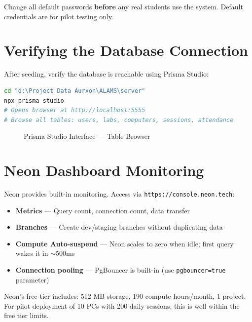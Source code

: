 \begin{tcolorbox}[dangerbox, title={\faExclamationCircle\quad Security Requirement}]
Change all default passwords \textbf{before} any real students use the system. Default credentials are for pilot testing only.
\end{tcolorbox}

\section{Verifying the Database Connection}

After seeding, verify the database is reachable using Prisma Studio:

\begin{tcolorbox}[codebox, title={Open Prisma Studio — Database Browser}]
\begin{lstlisting}[language=bash]
cd "d:\Project Data Aurxon\ALAMS\server"
npx prisma studio
# Opens browser at http://localhost:5555
# Browse all tables: users, labs, computers, sessions, attendance
\end{lstlisting}
\end{tcolorbox}

\begin{figure}[h!]
\centering
{}
\caption{Prisma Studio Interface — Table Browser}
\label{fig:prisma-studio}
\end{figure}

\section{Neon Dashboard Monitoring}

Neon provides built-in monitoring. Access via \texttt{https://console.neon.tech}:

\begin{itemize}[label={\textcolor{aurxonblue}{\faCheckCircle}}]
  \item \textbf{Metrics} — Query count, connection count, data transfer
  \item \textbf{Branches} — Create dev/staging branches without duplicating data
  \item \textbf{Compute Auto-suspend} — Neon scales to zero when idle; first query wakes it in $\sim$500ms
  \item \textbf{Connection pooling} — PgBouncer is built-in (use \texttt{pgbouncer=true} parameter)
\end{itemize}

\begin{tcolorbox}[alamsbox, title={\faLightbulb\quad Free Tier Limits}]
Neon's free tier includes: 512 MB storage, 190 compute hours/month, 1 project. For pilot deployment of 10 PCs with 200 daily sessions, this is well within the free tier limits.
\end{tcolorbox}
